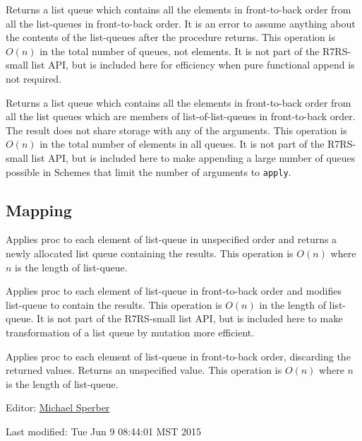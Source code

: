 \begin{entry}{%
  }

  Returns a list queue which contains all the elements in
  front-to-back order from all the list-queues in front-to-back
  order. It is an error to assume anything about the contents of the
  list-queues after the procedure returns. This operation is $O(n)$ in
  the total number of queues, not elements. It is not part of the
  R7RS-small list API, but is included here for efficiency when pure
  functional append is not required.
\end{entry}

\begin{entry}{%
  }

  Returns a list queue which contains all the elements in
  front-to-back order from all the list queues which are members of
  list-of-list-queues in front-to-back order. The result does not
  share storage with any of the arguments. This operation is $O(n)$ in
  the total number of elements in all queues. It is not part of the
  R7RS-small list API, but is included here to make appending a large
  number of queues possible in Schemes that limit the number of
  arguments to \texttt{apply}.
\end{entry}

\subsection{Mapping}\label{Mapping}

\begin{entry}{%
  }

  Applies proc to each element of list-queue in unspecified order and
  returns a newly allocated list queue containing the results. This
  operation is $O(n)$ where $n$ is the length of list-queue.
\end{entry}

\begin{entry}{%
  }

  Applies proc to each element of list-queue in front-to-back order
  and modifies list-queue to contain the results. This operation is
  $O(n)$ in the length of list-queue. It is not part of the R7RS-small
  list API, but is included here to make transformation of a list
  queue by mutation more efficient.
\end{entry}

\begin{entry}{%
  }

  Applies proc to each element of list-queue in front-to-back order,
  discarding the returned values. Returns an unspecified value. This
  operation is $O(n)$ where $n$ is the length of list-queue.
\end{entry}

Editor:
\href{mailto:srfi-editors\%20at\%20srfi\%20dot\%20schemers\%20dot\%20org}{Michael
Sperber}

Last modified: Tue Jun 9 08:44:01 MST 2015
